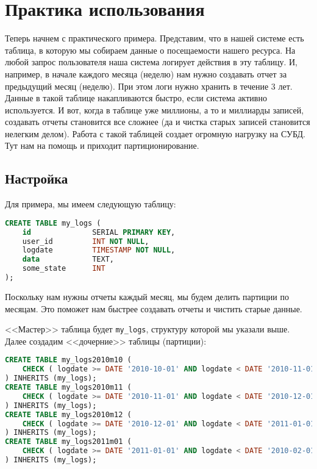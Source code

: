 \section{Практика использования}

Теперь начнем с практического примера. Представим, что в нашей системе есть таблица, в которую мы собираем данные о посещаемости нашего ресурса. На любой запрос пользователя наша система логирует действия в эту таблицу. И, например, в начале каждого месяца (неделю) нам нужно создавать отчет за предыдущий месяц (неделю). При этом логи нужно хранить в течение 3 лет. Данные в такой таблице накапливаются быстро, если система активно используется. И вот, когда в таблице уже миллионы, а то и миллиарды записей, создавать отчеты становится все сложнее (да и чистка старых записей становится нелегким делом). Работа с такой таблицей создает огромную нагрузку на СУБД. Тут нам на помощь и приходит партиционирование.

\subsection{Настройка}

Для примера, мы имеем следующую таблицу:

\begin{lstlisting}[language=SQL,label=lst:partitioning2,caption=<<Мастер>> таблица]
CREATE TABLE my_logs (
    id              SERIAL PRIMARY KEY,
    user_id         INT NOT NULL,
    logdate         TIMESTAMP NOT NULL,
    data            TEXT,
    some_state      INT
);
\end{lstlisting}

Поскольку нам нужны отчеты каждый месяц, мы будем делить партиции по месяцам. Это поможет нам быстрее создавать отчеты и чистить старые данные.

<<Мастер>> таблица будет \lstinline!my_logs!, структуру которой мы указали выше. Далее создадим <<дочерние>> таблицы (партиции):

\begin{lstlisting}[language=SQL,label=lst:partitioning3,caption=<<Дочерние>> таблицы]
CREATE TABLE my_logs2010m10 (
    CHECK ( logdate >= DATE '2010-10-01' AND logdate < DATE '2010-11-01' )
) INHERITS (my_logs);
CREATE TABLE my_logs2010m11 (
    CHECK ( logdate >= DATE '2010-11-01' AND logdate < DATE '2010-12-01' )
) INHERITS (my_logs);
CREATE TABLE my_logs2010m12 (
    CHECK ( logdate >= DATE '2010-12-01' AND logdate < DATE '2011-01-01' )
) INHERITS (my_logs);
CREATE TABLE my_logs2011m01 (
    CHECK ( logdate >= DATE '2011-01-01' AND logdate < DATE '2010-02-01' )
) INHERITS (my_logs);
\end{lstlisting}

